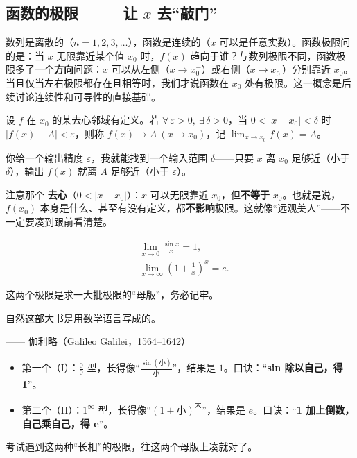 \documentclass[11pt,a4paper]{article}
\newcommand{\qattr}[1]{{\normalfont\upshape\small\par\raggedleft—— #1\par}}
\newcommand{\keyw}[1]{\colorbox{cYellowL}{\textbf{\color{cOrange}#1}}}
\newcommand{\hl}[1]{\colorbox{cYellow!40}{#1}}
\begin{document}
\newpage
\subsection{函数的极限 —— 让 $x$ 去“敲门”}

数列是离散的（$n=1,2,3,\dots$），函数是连续的（$x$ 可以是任意实数）。函数极限问的是：当 $x$ 无限靠近某个值 $x_0$ 时，$f(x)$ 趋向于谁？与数列极限不同，函数极限多了一个\textbf{方向}问题：$x$ 可以从左侧（$x\to x_0^-$）或右侧（$x\to x_0^+$）分别靠近 $x_0$。当且仅当左右极限都存在且相等时，我们才说函数在 $x_0$ 处有极限。这一概念是后续讨论连续性和可导性的直接基础。

\begin{defbox}
设 $f$ 在 $x_0$ 的某去心邻域有定义。若 $\forall\,\varepsilon>0,\ \exists\,\delta>0$，当 $0<|x-x_0|<\delta$ 时 $|f(x)-A|<\varepsilon$，则称 $f(x)\to A\ (x\to x_0)$，记 $\displaystyle\lim_{x\to x_0}f(x)=A$。
\end{defbox}

\begin{plainbox}
你给一个输出精度 $\varepsilon$，我就能找到一个输入范围 $\delta$——只要 $x$ 离 $x_0$ 足够近（小于 $\delta$），输出 $f(x)$ 就离 $A$ 足够近（小于 $\varepsilon$）。

注意那个 \keyw{去心}（$0<|x-x_0|$）：$x$ 可以无限靠近 $x_0$，但\textbf{不等于} $x_0$。也就是说，$f(x_0)$ 本身是什么、甚至有没有定义，都\textbf{不影响}极限。这就像“远观美人”——不一定要凑到跟前看清楚。
\end{plainbox}

\begin{thmbox}[两个重要极限 —— 必背！]
\begin{eqbox}\begin{align}
  &\lim_{x\to 0}\frac{\sin x}{x}=1, \tag{I}\\[4pt]
  &\lim_{x\to\infty}\left(1+\frac{1}{x}\right)^{x}=e. \tag{II}
\end{align}\end{eqbox}
这两个极限是求一大批极限的“母版”，务必记牢。
\end{thmbox}

\begin{quotebox}
自然这部大书是用数学语言写成的。
\qattr{伽利略（Galileo Galilei，1564--1642）}
\end{quotebox}

\begin{plainbox}
\begin{itemize}[leftmargin=1.4em,itemsep=3pt]
  \item 第一个（I）：\hl{$\tfrac{0}{0}$ 型}，长得像“$\tfrac{\sin(\text{小})}{\text{小}}$”，结果是 $1$。口诀：“\textbf{sin 除以自己，得 1}”。
  \item 第二个（II）：\hl{$1^{\infty}$ 型}，长得像“$(1+\text{小})^{\text{大}}$”，结果是 $e$。口诀：“\textbf{1 加上倒数，自己乘自己，得 e}”。
\end{itemize}
考试遇到这两种“长相”的极限，往这两个母版上凑就对了。
\end{plainbox}
\end{document}
